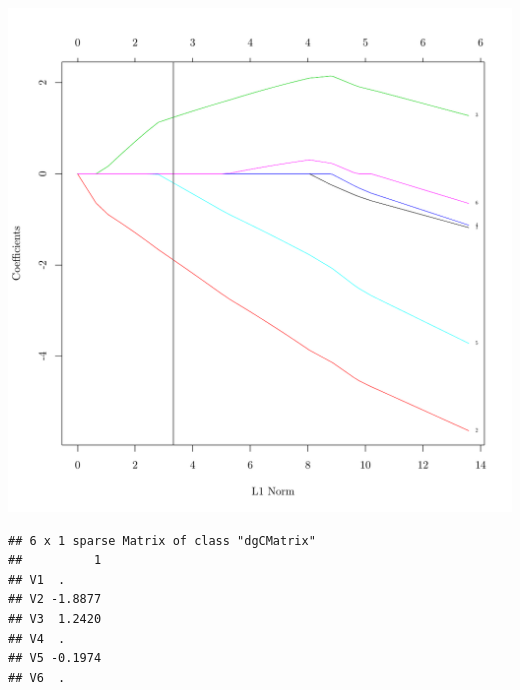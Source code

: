 \documentclass{article}
\begin{document}
\begin{knitrout}
{\centering \includegraphics[width=\maxwidth]{figure/nmf-metagene-glmnet-plots-6} 

}


\begin{kframe}\begin{alltt}
\hlopt{$}  \hlopt{$}
\end{alltt}
\begin{verbatim}
## 6 x 1 sparse Matrix of class "dgCMatrix"
##          1
## V1  .     
## V2 -1.8877
## V3  1.2420
## V4  .     
## V5 -0.1974
## V6  .
\end{verbatim}
\end{kframe}
\end{knitrout}


\end{document}
